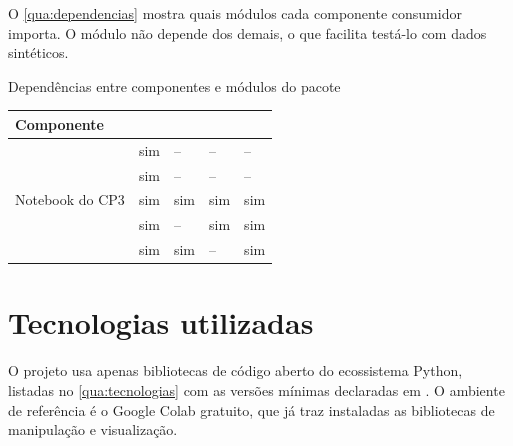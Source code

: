 O \autoref{qua:dependencias} mostra quais módulos cada componente consumidor
importa. O módulo  não depende dos demais, o que facilita
testá-lo com dados sintéticos.

\begin{quadro}[htbp]
\caption{\label{qua:dependencias}Dependências entre componentes e módulos do pacote}
\begin{corpotabela}
\begin{tabularx}{\textwidth}{|Y|C{1.9cm}|C{1.9cm}|C{2.3cm}|C{2.3cm}|}
\hline
\textbf{Componente} &  &  &  &  \\ \hline
{} & sim & -- & -- & -- \\ \hline
{} & sim & -- & -- & -- \\ \hline
Notebook do CP3 & sim & sim & sim & sim \\ \hline
{} & sim & -- & sim & sim \\ \hline
{} & sim & sim & -- & sim \\ \hline
\end{tabularx}
\end{corpotabela}
\fonteautores[Elaborado]
\end{quadro}

\section{Tecnologias utilizadas}\label{sec:tecnologias}

O projeto usa apenas bibliotecas de código aberto do ecossistema Python,
listadas no \autoref{qua:tecnologias} com as versões mínimas declaradas em
. O ambiente de referência é o Google Colab gratuito, que
já traz instaladas as bibliotecas de manipulação e visualização.

